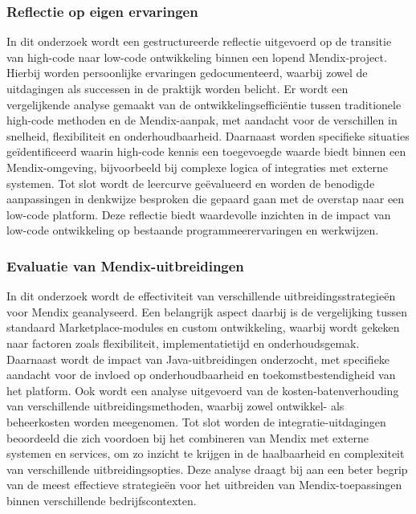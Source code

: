 \subsubsection{Reflectie op eigen ervaringen}
In dit onderzoek wordt een gestructureerde reflectie uitgevoerd op de transitie van high-code naar low-code ontwikkeling binnen een lopend Mendix-project. Hierbij worden persoonlijke ervaringen gedocumenteerd, waarbij zowel de uitdagingen als successen in de praktijk worden belicht. Er wordt een vergelijkende analyse gemaakt van de ontwikkelingsefficiëntie tussen traditionele high-code methoden en de Mendix-aanpak, met aandacht voor de verschillen in snelheid, flexibiliteit en onderhoudbaarheid. Daarnaast worden specifieke situaties geïdentificeerd waarin high-code kennis een toegevoegde waarde biedt binnen een Mendix-omgeving, bijvoorbeeld bij complexe logica of integraties met externe systemen. Tot slot wordt de leercurve geëvalueerd en worden de benodigde aanpassingen in denkwijze besproken die gepaard gaan met de overstap naar een low-code platform. Deze reflectie biedt waardevolle inzichten in de impact van low-code ontwikkeling op bestaande programmeerervaringen en werkwijzen.

\subsubsection{Evaluatie van Mendix-uitbreidingen}
In dit onderzoek wordt de effectiviteit van verschillende uitbreidingsstrategieën voor Mendix geanalyseerd. Een belangrijk aspect daarbij is de vergelijking tussen standaard Marketplace-modules en custom ontwikkeling, waarbij wordt gekeken naar factoren zoals flexibiliteit, implementatietijd en onderhoudsgemak. Daarnaast wordt de impact van Java-uitbreidingen onderzocht, met specifieke aandacht voor de invloed op onderhoudbaarheid en toekomstbestendigheid van het platform. Ook wordt een analyse uitgevoerd van de kosten-batenverhouding van verschillende uitbreidingsmethoden, waarbij zowel ontwikkel- als beheerkosten worden meegenomen. Tot slot worden de integratie-uitdagingen beoordeeld die zich voordoen bij het combineren van Mendix met externe systemen en services, om zo inzicht te krijgen in de haalbaarheid en complexiteit van verschillende uitbreidingsopties. Deze analyse draagt bij aan een beter begrip van de meest effectieve strategieën voor het uitbreiden van Mendix-toepassingen binnen verschillende bedrijfscontexten.

